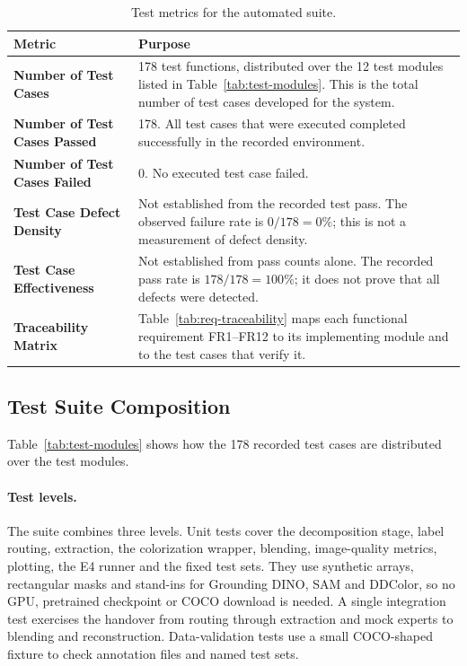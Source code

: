 \documentclass{FastFyp}
\begin{document}
\begin{table}[!htbp]
\centering
\caption{Test metrics for the automated suite.}
\label{tab:test-metrics}
\small
\setlength{\tabcolsep}{5pt}
\renewcommand{\arraystretch}{1.15}
\begin{tabular}{|p{}|p{}|}
\hline
\textbf{Metric} & \textbf{Purpose} \\ \hline
\textbf{Number of Test Cases} & 178 test functions, distributed over the 12
test modules listed in Table~\ref{tab:test-modules}. This is the total number
of test cases developed for the system. \\ \hline
\textbf{Number of Test Cases Passed} & 178. All test cases that were executed
completed successfully in the recorded environment. \\ \hline
\textbf{Number of Test Cases Failed} & 0. No executed test case failed. \\
\hline
\textbf{Test Case Defect Density} & Not established from the recorded test pass. The observed failure rate is $0/178=0\%$; this is not a measurement of defect density. \\
\hline
\textbf{Test Case Effectiveness} & Not established from pass counts alone. The recorded pass rate is $178/178=100\%$; it does not prove that all defects were detected. \\ \hline
\textbf{Traceability Matrix} & Table~\ref{tab:req-traceability} maps each
functional requirement FR1--FR12 to its implementing module and to the test
cases that verify it. \\ \hline
\end{tabular}
\end{table}

\subsection{Test Suite Composition}
\label{sec:test-suite-composition}
Table~\ref{tab:test-modules} shows how the 178 recorded test cases are distributed over the test modules.

\paragraph{Test levels.} The suite combines three levels. Unit tests cover the
decomposition stage, label routing, extraction, the colorization wrapper,
blending, image-quality metrics, plotting, the E4 runner and the fixed test
sets. They use synthetic arrays, rectangular masks and stand-ins for Grounding
DINO, SAM and DDColor, so no GPU, pretrained checkpoint or COCO download is
needed. A single integration test exercises the handover from routing through
extraction and mock experts to blending and reconstruction. Data-validation
tests use a small COCO-shaped fixture to check annotation files and named test
sets.
\end{document}
